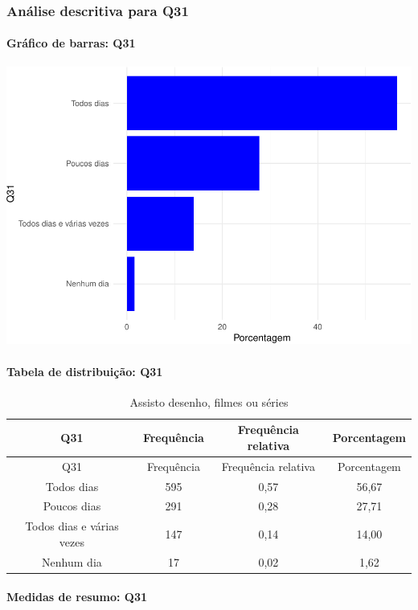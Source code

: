 \documentclass[]{article}
\let\oldparagraph\paragraph
\renewcommand{\paragraph}[1]{\oldparagraph{#1}\mbox{}}
\begin{document}
\hypertarget{anuxe1lise-descritiva-para-q31}{%
\subsubsection{Análise descritiva para Q31}\label{anuxe1lise-descritiva-para-q31}}

\hypertarget{gruxe1fico-de-barras-q31}{%
\paragraph{Gráfico de barras: Q31}\label{gruxe1fico-de-barras-q31}}

\begin{center}\includegraphics[width=0.75\linewidth]{relatorio_covid19_files/figure-latex/unnamed-chunk-1012-1} \end{center}

\hypertarget{tabela-de-distribuiuxe7uxe3o-q31}{%
\paragraph{Tabela de distribuição: Q31}\label{tabela-de-distribuiuxe7uxe3o-q31}}

\begin{longtable}[]{@{}cccc@{}}
\caption{\label{tab:unnamed-chunk-1013}Assisto desenho, filmes ou séries}\tabularnewline
\toprule
Q31 & Frequência & Frequência relativa & Porcentagem\tabularnewline
\midrule
\endfirsthead
\toprule
Q31 & Frequência & Frequência relativa & Porcentagem\tabularnewline
\midrule
\endhead
Todos dias & 595 & 0,57 & 56,67\tabularnewline
Poucos dias & 291 & 0,28 & 27,71\tabularnewline
Todos dias e várias vezes & 147 & 0,14 & 14,00\tabularnewline
Nenhum dia & 17 & 0,02 & 1,62\tabularnewline
\bottomrule
\end{longtable}

\hypertarget{medidas-de-resumo-q31}{%
\paragraph{Medidas de resumo: Q31}\label{medidas-de-resumo-q31}}
\end{document}

